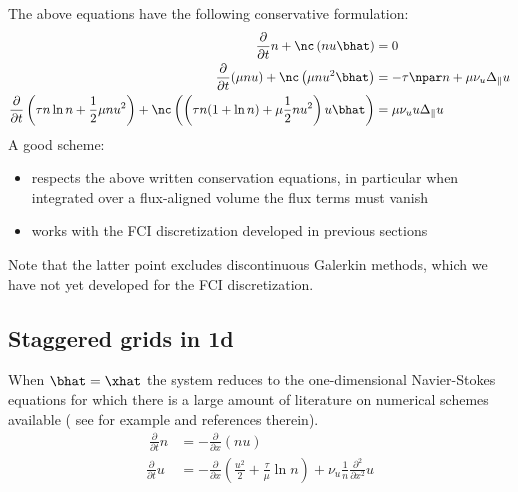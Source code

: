 The above equations have the following conservative formulation:
\begin{align}
    \frac{\partial}{\partial t} n  + \nc\left( nu \bhat\right) &= 0 \\
    \frac{\partial}{\partial t} (\mu nu)  + \nc\left(\mu nu^2 \bhat\right) &=
    -\tau \npar n + \mu \nu_u \Delta_\parallel u \\
    \frac{\partial}{\partial t} \left(\tau n \ln n + \frac{1}{2}\mu nu^2\right)
    + \nc\left( \left( \tau n ( 1 + \ln n)  +\mu \frac{1}{2} nu^2\right) u\bhat \right) &= \mu \nu_u u \Delta_\parallel u
\end{align}
A good scheme:
\begin{itemize}
    \item respects the above written conservation equations, in particular when
        integrated over a flux-aligned volume the flux terms must vanish
    \item works with the FCI discretization developed in previous sections
\end{itemize}
Note that the latter point excludes discontinuous Galerkin methods, which we have not
yet developed for the FCI discretization.
\subsection{Staggered grids in 1d}
When $\bhat = \xhat$ the system reduces to the one-dimensional Navier-Stokes equations for which there is a large amount of literature on numerical schemes available
( see for example \cite{LeVeque} and references therein).
\begin{align}
    \
    \frac{\partial}{\partial t} n &= - \frac{\partial}{\partial x}\left( nu\right) \\
    \frac{\partial}{\partial t} u &= - \frac{\partial}{\partial x}\left(\frac{u^2}{2} + \frac{\tau}{\mu} \ln n\right) + \nu_u \frac{1}{n}\frac{\partial^2}{\partial x^2} u
\end{align}

